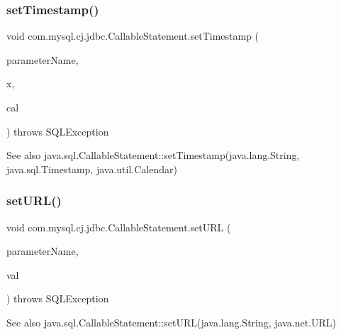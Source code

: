 \subsubsection{\texorpdfstring{set\+Timestamp()}{setTimestamp()}\hspace{0.1cm}{\footnotesize\ttfamily [2/2]}}
{\footnotesize\ttfamily void com.\+mysql.\+cj.\+jdbc.\+Callable\+Statement.\+set\+Timestamp (\begin{DoxyParamCaption}\item[{String}]{parameter\+Name,  }\item[{Timestamp}]{x,  }\item[{Calendar}]{cal }\end{DoxyParamCaption}) throws S\+Q\+L\+Exception}

\begin{DoxySeeAlso}{See also}
java.\+sql.\+Callable\+Statement\+::set\+Timestamp(java.\+lang.\+String, java.\+sql.\+Timestamp, java.\+util.\+Calendar) 
\end{DoxySeeAlso}
\mbox{\label{classcom_1_1mysql_1_1cj_1_1jdbc_1_1_callable_statement_ad9619f612112c6427341179cd909a058}} 
\subsubsection{\texorpdfstring{set\+U\+R\+L()}{setURL()}}
{\footnotesize\ttfamily void com.\+mysql.\+cj.\+jdbc.\+Callable\+Statement.\+set\+U\+RL (\begin{DoxyParamCaption}\item[{String}]{parameter\+Name,  }\item[{U\+RL}]{val }\end{DoxyParamCaption}) throws S\+Q\+L\+Exception}

\begin{DoxySeeAlso}{See also}
java.\+sql.\+Callable\+Statement\+::set\+U\+RL(java.\+lang.\+String, java.\+net.\+U\+RL) 
\end{DoxySeeAlso}
\mbox{\label{classcom_1_1mysql_1_1cj_1_1jdbc_1_1_callable_statement_a49a33a86678de625aaf3d944363eb7d5}} 
